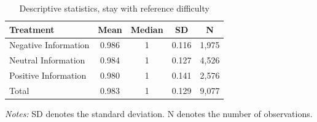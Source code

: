 \begin{table}[htbp]
\centering
\caption{Descriptive statistics, stay with reference difficulty}
\label{tab:descriptive_stay_ref}
\begin{threeparttable}
\begin{tabular}{lcccc}
\hline\hline
Treatment & Mean & Median & SD & N \\
\hline
Negative Information & 0.986 & 1 & 0.116 & 1,975 \\
Neutral Information & 0.984 & 1 & 0.127 & 4,526 \\
Positive Information & 0.980 & 1 & 0.141 & 2,576 \\
\hline
Total & 0.983 & 1 & 0.129 & 9,077 \\
\hline\hline
\end{tabular}
\begin{tablenotes}[flushleft]
\footnotesize
\item[] \textit{Notes:} SD denotes the standard deviation. N denotes the number of observations.
\end{tablenotes}
\end{threeparttable}
\end{table}
